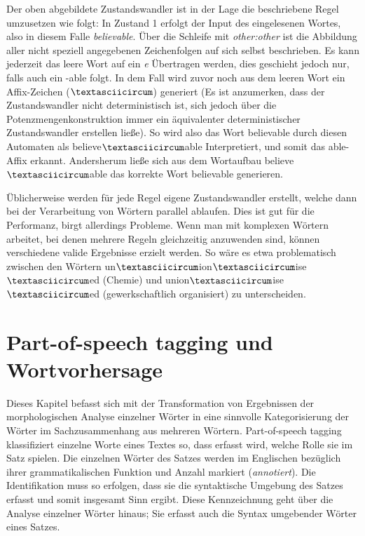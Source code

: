 \documentclass[12pt]{report}
\begin{document}
Der oben abgebildete Zustandswandler ist in der Lage die beschriebene Regel umzusetzen wie folgt: In Zustand 1 erfolgt der Input des eingelesenen Wortes, also in diesem Falle \textit{\glqq  believable\grqq{}}. Über die Schleife mit \textit{\glqq  other:other\grqq{}} ist die Abbildung aller nicht speziell angegebenen Zeichenfolgen auf sich selbst beschrieben. Es kann jederzeit das leere Wort auf ein \textit{\glqq  e\grqq{}} Übertragen werden, dies geschieht jedoch nur, falls auch ein \glqq  -able\grqq{} folgt. In dem Fall wird zuvor noch aus dem leeren Wort ein Affix-Zeichen ($\textasciicircum$) generiert (Es ist anzumerken, dass der Zustandswandler nicht deterministisch ist, sich jedoch über die Potenzmengenkonstruktion immer ein äquivalenter deterministischer Zustandswandler erstellen ließe). So wird also das Wort \glqq  believable\grqq{} durch diesen Automaten als \glqq  believe$\textasciicircum$able\grqq{} Interpretiert, und somit das \glqq  able\grqq{}-Affix erkannt. Andersherum ließe sich aus dem Wortaufbau \glqq  believe$\textasciicircum$able\grqq{} das korrekte Wort \glqq  believable\grqq{} generieren.

Üblicherweise werden für jede Regel eigene Zustandswandler erstellt, welche dann bei der Verarbeitung von Wörtern parallel ablaufen. Dies ist gut für die Performanz, birgt allerdings Probleme. Wenn man mit komplexen Wörtern arbeitet, bei denen mehrere Regeln gleichzeitig anzuwenden sind, können verschiedene valide Ergebnisse erzielt werden. So wäre es etwa problematisch zwischen den Wörtern \glqq  un$\textasciicircum$ion$\textasciicircum$ise$\textasciicircum$ed\grqq{} (Chemie) und \glqq  union$\textasciicircum$ise$\textasciicircum$ed\grqq{} (gewerkschaftlich organisiert) zu unterscheiden. 

\section[POS tagging und Wortvorhersage]{Part-of-speech tagging und \\Wortvorhersage}
Dieses Kapitel befasst sich mit der Transformation von Ergebnissen der morphologischen Analyse einzelner Wörter in eine sinnvolle Kategorisierung der Wörter im Sachzusammenhang aus mehreren Wörtern. Part-of-speech tagging klassifiziert einzelne Worte eines Textes so, dass erfasst wird, welche Rolle sie im Satz spielen. Die einzelnen Wörter des Satzes werden im Englischen bezüglich ihrer grammatikalischen Funktion und Anzahl markiert (\textit{annotiert}). Die Identifikation muss so erfolgen, dass sie die syntaktische Umgebung des Satzes erfasst und somit insgesamt Sinn ergibt. Diese Kennzeichnung geht über die Analyse einzelner Wörter hinaus; Sie erfasst auch die Syntax umgebender Wörter eines Satzes. 
\end{document}
